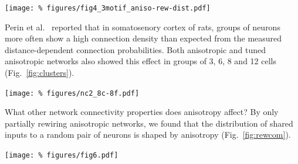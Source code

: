 \begin{center}\vspace{0.01cm}
  \texttt{[image: \%
    figures/fig4\_3motif\_aniso-rew-dist.pdf]}
  \label{fig:3neuron}
\end{center}\vspace{2cm}

Perin et al.~\cite{Perin2011} reported that in somatosenory cortex of
rats, groups of neurons more often show a high connection density than
expected from the measured distance-dependent connection
probabilities. Both anisotropic and tuned anisotropic networks also
showed this effect in groups of 3, 6, 8 and 12 cells
(Fig.~\ref{fig:clusters}).

\begin{center}\vspace{0.01cm}
  \texttt{[image: \%
    figures/nc2\_8c-8f.pdf]} 
  \label{fig:clusters}
\end{center}\vspace{2cm}

What other network connectivity properties does anisotropy affect? By only partially rewiring anisotropic networks, we found that the distribution of shared inputs to a random pair of neurons is shaped by anisotropy (Fig.~\ref{fig:rewcom}).


\begin{center}\vspace{0.01cm}
  \texttt{[image: \%
    figures/fig6.pdf]}
  \label{fig:rewcom}
\end{center}\vspace{2cm}






